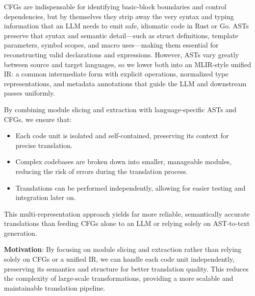 \documentclass[twocolumn]{article}
\begin{document}
\medskip
\noindent
CFGs are indispensable for identifying basic-block boundaries and control dependencies, but by themselves they strip away the very syntax and typing information that an LLM needs to emit safe, idiomatic code in Rust or Go.  ASTs preserve that syntax and semantic detail—such as struct definitions, template parameters, symbol scopes, and macro uses—making them essential for reconstructing valid declarations and expressions. However, ASTs vary greatly between source and target languages, so we lower both into an MLIR-style unified IR: a common intermediate form with explicit operations, normalized type representations, and metadata annotations that guide the LLM and downstream passes uniformly.  

By combining module slicing and extraction with language-specific ASTs and CFGs, we ensure that: 
\begin{itemize} 
    \item Each code unit is isolated and self-contained, preserving its context for precise translation. 
    \item Complex codebases are broken down into smaller, manageable modules, reducing the risk of errors during the translation process. 
    \item Translations can be performed independently, allowing for easier testing and integration later on. 
\end{itemize}

This multi-representation approach yields far more reliable, semantically accurate translations than feeding CFGs alone to an LLM or relying solely on AST-to-text generation.  

\textbf{Motivation}: By focusing on module slicing and extraction rather than relying solely on CFGs or a unified IR, we can handle each code unit independently, preserving its semantics and structure for better translation quality. This reduces the complexity of large-scale transformations, providing a more scalable and maintainable translation pipeline.
\end{document}
